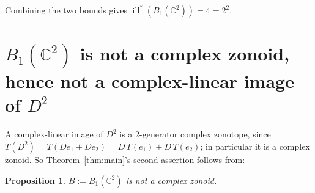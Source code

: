 \documentclass[11pt]{amsart}
\newtheorem{proposition}[theorem]{Proposition}
\theoremstyle{remark}
\DeclareMathOperator{\ill}{ill}
\newcommand{\CC}{\mathbb{C}}
\newcommand{\illstar}{\ill^{*}}
\begin{document}
Combining the two bounds gives $\illstar(B_{1}(\CC^{2}))=4=2^{2}$.

\section{\texorpdfstring{$B_{1}(\CC^{2})$}{B1(C2)} is not a complex zonoid, hence
not a complex-linear image of \texorpdfstring{$D^{2}$}{D2}}\label{sec:zonoid}

A complex-linear image of $D^{2}$ is a $2$-generator complex zonotope, since
$T(D^{2})=T(De_{1}+De_{2})=D\,T(e_{1})+D\,T(e_{2})$; in particular it is a
complex zonoid. So Theorem~\ref{thm:main}'s second assertion follows from:

\begin{proposition}\label{prop:zonoid}
$B:=B_{1}(\CC^{2})$ is not a complex zonoid.
\end{proposition}
\end{document}

